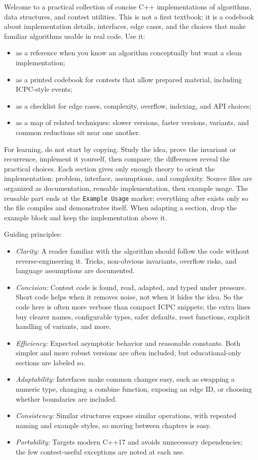 \documentclass[10pt,letterpaper,twoside]{book}
\begin{document}
Welcome to a practical collection of concise C++ implementations of algorithms, data structures, and
contest utilities. This is not a first textbook; it is a codebook about implementation details,
interfaces, edge cases, and the choices that make familiar algorithms usable in real code. Use it:
\begin{itemize}
	\item as a reference when you know an algorithm conceptually but want a clean implementation;
	\item as a printed codebook for contests that allow prepared material, including ICPC-style
	events;
	\item as a checklist for edge cases, complexity, overflow, indexing, and API choices;
	\item as a map of related techniques: slower versions, faster versions, variants, and common
	reductions sit near one another.
\end{itemize}

For learning, do not start by copying. Study the idea, prove the invariant or recurrence, implement
it yourself, then compare; the differences reveal the practical choices. Each section gives only
enough theory to orient the implementation: problem, interface, assumptions, and complexity. Source
files are organized as documentation, reusable implementation, then example usage. The reusable part
ends at the \texttt{Example Usage} marker; everything after exists only so the file compiles and
demonstrates itself. When adapting a section, drop the example block and keep the implementation
above it.

Guiding principles:
\begin{itemize}
	\item \textit{Clarity:} A reader familiar with the algorithm should follow the code without
	reverse-engineering it. Tricks, non-obvious invariants, overflow risks, and language assumptions
	are documented.
	\item \textit{Concision:} Contest code is found, read, adapted, and typed under pressure. Short
	code helps when it removes noise, not when it hides the idea. So the code here is often more
	verbose than compact ICPC snippets; the extra lines buy clearer names, configurable types, safer
	defaults, reset functions, explicit handling of variants, and more.
	\item \textit{Efficiency:} Expected asymptotic behavior and reasonable constants. Both simpler
	and more robust versions are often included, but educational-only sections are labeled so.
	\item \textit{Adaptability:} Interfaces make common changes easy, such as swapping a numeric type,
	changing a combine function, exposing an edge ID, or choosing whether boundaries are included.
	\item \textit{Consistency:} Similar structures expose similar operations, with repeated naming and
	example styles, so moving between chapters is easy.
	\item \textit{Portability:} Targets modern C++17 and avoids unnecessary dependencies; the few
	contest-useful exceptions are noted at each use.
\end{itemize}
\end{document}

